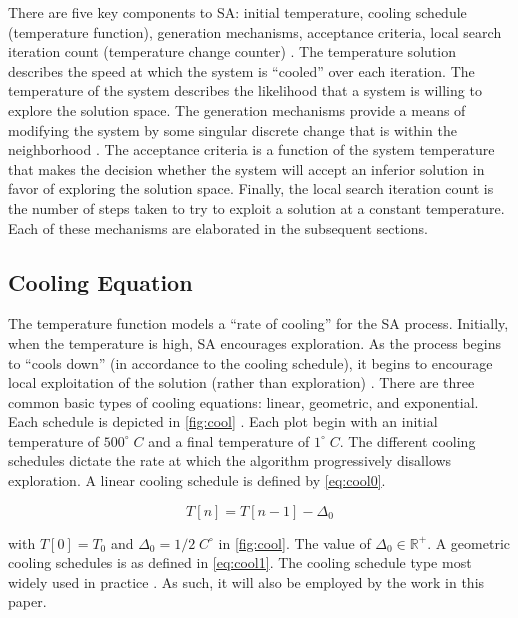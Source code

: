 \documentclass[11pt,a4paper,final]{article}
\newcommand{\Tau}{T}                        %
\begin{document}
There are five key components to SA: initial temperature, cooling schedule (temperature function), generation
mechanisms, acceptance criteria, local search iteration count (temperature change counter)
\cite{keller-2019-multi-objec}. The temperature solution describes the speed at which the system is ``cooled'' over each
iteration. The temperature of the system describes the likelihood that a system is willing to explore the solution
space. The generation mechanisms provide a means of modifying the system by some singular discrete change that is within
the neighborhood \cite{gendreau-2018-handb-metah}. The acceptance criteria is a function of the system temperature that
makes the decision whether the system will accept an inferior solution in favor of exploring the solution space.
Finally, the local search iteration count is the number of steps taken to try to exploit a solution at a constant
temperature. Each of these mechanisms are elaborated in the subsequent sections.

\subsection{Cooling Equation}
\label{cooling-equation-experimental}
The temperature function models a ``rate of cooling'' for the SA process. Initially, when the temperature is high, SA
encourages exploration. As the process begins to ``cools down'' (in accordance to the cooling schedule), it begins to
encourage local exploitation of the solution (rather than exploration)
\cite{rutenbar-1989-simul-anneal-algor,henderson-1989-theor-pract}. There are three common basic types of cooling
equations: linear, geometric, and exponential. Each schedule is depicted in \ref{fig:cool} \cite{keller-2019-multi-objec}.
Each plot begin with an initial temperature of \(500^\circ\; C\) and a final temperature of \(1^\circ\; C\). The different cooling
schedules dictate the rate at which the algorithm progressively disallows exploration. A linear cooling schedule is
defined by \ref{eq:cool0}.

\begin{equation}
\label{eq:cool0}
\Tau[n] = \Tau[n-1] - \Delta_0
\end{equation}

with \(\Tau[0] = \Tau_0\) and \(\Delta_0 = 1/2\; C^\circ\) in \ref{fig:cool}. The value of \(\Delta_0 \in \mathbb{R}^+\). A geometric cooling schedules is as
defined in \ref{eq:cool1}. The cooling schedule type most widely used in practice \cite{keller-2019-multi-objec}. As such, it
will also be employed by the work in this paper.
\end{document}
